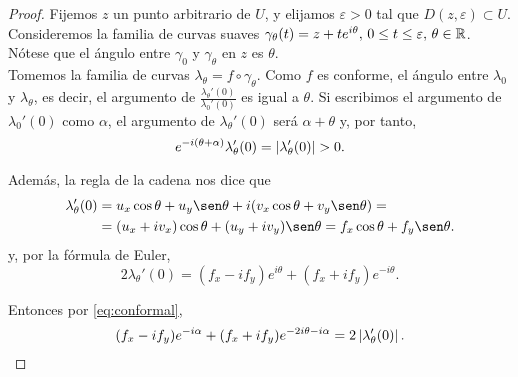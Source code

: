 \begin{proof}
    Fijemos $z$ un punto arbitrario de $U$, y elijamos $\varepsilon > 0$ tal que $D(z, \varepsilon) \subset U$. Consideremos la familia de curvas suaves $\gamma_{\theta}(t) = z + te^{i \theta}, \, 0 \leq t \leq \varepsilon, \, \theta \in \mathbb{R}$. Nótese que el ángulo entre $\gamma_0$ y $\gamma_{\theta}$ en $z$ es $\theta$. \\

     Tomemos la familia de curvas $\lambda_\theta = f \circ \gamma_\theta$. Como $f$ es conforme, el ángulo entre $\lambda_0$ y $\lambda_{\theta}$, es decir, el argumento de $\frac{\lambda_{\theta}'(0)}{\lambda_0' (0)}$ es igual a $\theta$. Si escribimos el argumento de $\lambda_0'(0)$ como $\alpha$, el argumento de $\lambda_{\theta}'(0)$ será $\alpha+\theta$ y, por tanto,
    \begin{equation}
    \label{eq:conformal}
        e^{-i(\theta + \alpha)} \lambda_{\theta}'(0)= \left\lvert\lambda_{\theta}'(0)\right\rvert > 0.
    \end{equation}

    Además, la regla de la cadena nos dice que %
    \begin{equation}
        \begin{split}
        \label{eq:nonulo}
            \lambda_{\theta}'(0) & = u_x \cos \theta + u_y \sen \theta + i(v_x \cos \theta + v_y \sen \theta) = \\
                             & = (u_x + iv_x) \cos \theta + (u_y + i v_y) \sen \theta = f_x \cos \theta + f_y \sen \theta.
        \end{split}
    \end{equation}
    y, por la fórmula de Euler, %
    \begin{equation*}
        2 \lambda_{\theta}'(0) = (f_x - i f_y) e^{i \theta} + (f_x + i f_y) e^{-i \theta}.
    \end{equation*}

    Entonces por \eqref{eq:conformal}, %
    \begin{equation*}
         (f_x - i f_y) e^{-i \alpha} + (f_x + i f_y) e^{-2i \theta -i  \alpha} = 2 \left\lvert\lambda_{\theta}'(0)\right\rvert.
    \end{equation*}


\end{proof}
